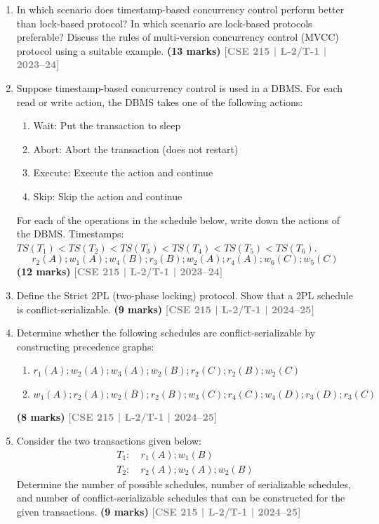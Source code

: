 \documentclass[12pt,a3paper]{article}
\newcommand{\yr}[1]{\hfill\textcolor{gray}{\small\textbf{[#1]}}}
\newcommand{\mk}[1]{\textcolor{orange!70!black}{\small\textbf{(#1 marks)}}}
\begin{document}
\begin{enumerate}
\item In which scenario does timestamp-based concurrency control perform better than lock-based protocol? In which scenario are lock-based protocols preferable? Discuss the rules of multi-version concurrency control (MVCC) protocol using a suitable example.
\mk{13} \yr{CSE 215 | L-2/T-1 | 2023--24}

\item Suppose timestamp-based concurrency control is used in a DBMS. For each read or write action, the DBMS takes one of the following actions:
\begin{enumerate}
\item Wait: Put the transaction to sleep 
\item Abort: Abort the transaction (does not restart)
\item Execute: Execute the action and continue
\item Skip: Skip the action and continue
\end{enumerate}
For each of the operations in the schedule below, write down the actions of the DBMS. Timestamps: $TS(T_1) < TS(T_2) < TS(T_3) < TS(T_4) < TS(T_5) < TS(T_6)$.
\[r_2(A); w_1(A); w_4(B); r_3(B); w_2(A); r_4(A); w_6(C); w_5(C)\]
\mk{12} \yr{CSE 215 | L-2/T-1 | 2023--24}

\item Define the Strict 2PL (two-phase locking) protocol. Show that a 2PL schedule is conflict-serializable.
\mk{9} \yr{CSE 215 | L-2/T-1 | 2024--25}

\item Determine whether the following schedules are conflict-serializable by constructing precedence graphs:
\begin{enumerate}
  \item $r_1(A); w_2(A); w_3(A); w_2(B); r_2(C); r_2(B); w_2(C)$
  \item $w_1(A); r_2(A); w_2(B); r_2(B); w_3(C); r_4(C); w_4(D); r_3(D); r_3(C)$
\end{enumerate}
\mk{8} \yr{CSE 215 | L-2/T-1 | 2024--25}

\item Consider the two transactions given below:
\begin{align*}
T_1\colon &\ r_1(A); w_1(B)\\
T_2\colon &\ r_2(A); w_2(A); w_2(B)
\end{align*}
Determine the number of possible schedules, number of serializable schedules, and number of conflict-serializable schedules that can be constructed for the given transactions.
\mk{9} \yr{CSE 215 | L-2/T-1 | 2024--25}


\end{enumerate}
\end{document}
